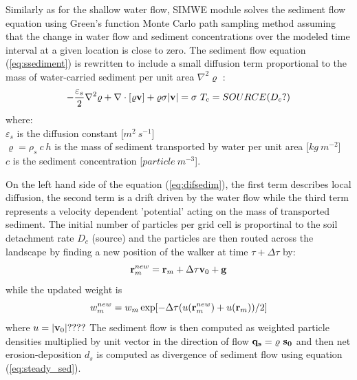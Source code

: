 \documentclass[gmd, manuscript]{copernicus}
\begin{document}
Similarly as for the shallow water flow, SIMWE module solves the sediment flow 
equation using Green's function Monte Carlo path sampling method
assuming that the change in water flow
and sediment concentrations over the modeled time interval at a given location is close to zero.
The sediment flow equation (\ref{eq:ssediment}) 
%
is rewritten to include a small diffusion term proportional to the 
mass of water-carried sediment per unit area $\nabla^2 \varrho$ :
\begin{equation}
\label{eq:difsedim}
-{\varepsilon_s \over 2}\nabla^2 \varrho
+ \nabla\cdot [\varrho {\bf v}]
 + \varrho \sigma |{\bf v}|
= \sigma~T_c = SOURCE (D_c?)
\end{equation}
{\small
\noindent
where: \\
\noindent
\hspace*{0.5em} $\varepsilon_s$ is the diffusion constant [$\unit{m^2~s^{-1}}$]\\
\hspace*{0.5em} $\varrho = \rho_s~c~h$ is the mass of sediment transported by water per unit area [$\unit{kg~m^{-2}}$] \\
\hspace*{0.5em} $c$ is the sediment concentration [$\unit{particle~m^{-3}}$].
}

On the left hand side of the equation (\ref{eq:difsedim}), the first term
describes local diffusion, the second term is a drift driven by the water flow
while the third term represents a velocity dependent 'potential' acting on 
the mass of transported sediment. %
The initial number of particles per grid cell is proportinal to the soil detachment rate $D_c$
(source) and the particles are then routed across the landscape by finding a new position 
of the walker at time $\tau + \Delta \tau$ by:
\begin{equation}
{\bf r}_m^{new}={\bf r}_m + \Delta \tau {\bf v}_0 + {\bf g}
\end{equation}
 while the updated weight is
\begin{equation}
w_m^{new}=w_m \exp[- \Delta \tau(u({\bf r}_m^{new})+u({\bf r}_m))/2]
\end{equation}
where $u = |{\bf v}_0|????$
The sediment flow is then computed as weighted particle densities 
multiplied by unit vector in the direction of flow
${\bf q_s} = \varrho~{\bf s_0}$ and then net erosion-deposition $d_s$ 
is computed as divergence of sediment flow using equation (\ref{eq:steady_sed}).
\end{document}
